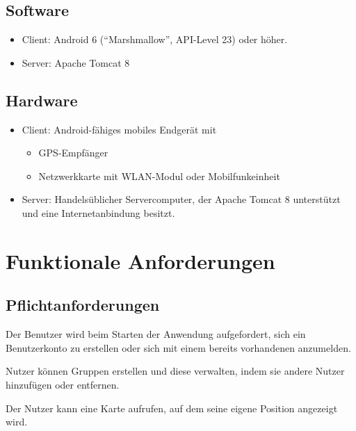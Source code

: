 \documentclass[parskip=full,11pt]{scrartcl}
\begin{document}
\subsection{Software}
\begin{itemize}
    \item Client: Android 6 (\enquote{Marshmallow}, API-Level 23) oder
        höher.
    \item Server: Apache Tomcat 8
\end{itemize}

\subsection{Hardware}
\begin{itemize}
    \item Client: Android-fähiges mobiles Endgerät mit
        \begin{itemize}
            \item GPS-Empfänger
            \item Netzwerkkarte mit WLAN-Modul oder Mobilfunkeinheit
        \end{itemize}
    \item Server: Handelsüblicher Servercomputer, der Apache Tomcat 8
        unterstützt und eine Internetanbindung besitzt.
\end{itemize}

\pagebreak
\section{Funktionale Anforderungen}

\subsection{Pflichtanforderungen}

%
Der Benutzer wird beim Starten der Anwendung aufgefordert, sich ein
Benutzerkonto zu erstellen oder sich mit einem bereits vorhandenen anzumelden.

%
Nutzer können Gruppen erstellen und diese verwalten, indem sie andere Nutzer
hinzufügen oder entfernen.

%
Der Nutzer kann eine Karte aufrufen, auf dem seine eigene Position angezeigt
wird.
\end{document}
